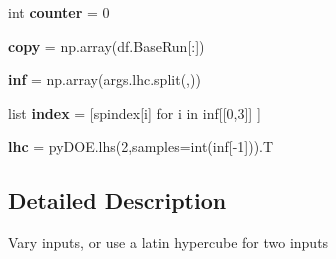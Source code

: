 \begin{DoxyCompactItemize}
int {\bfseries counter} = 0
\item 
\mbox{\label{namespacezics__sense_adad1c9bd87458cee13344e8c2c37d480}} 
{\bfseries copy} = np.\+array(df.\+Base\+Run\mbox{[}\+:\mbox{]})
\item 
\mbox{\label{namespacezics__sense_a28ee685820337f3c2a935246cfed9974}} 
{\bfseries inf} = np.\+array(args.\+lhc.\+split(\textquotesingle{},\textquotesingle{}))
\item 
\mbox{\label{namespacezics__sense_a4c16dfebc4d8f9aa0ca680fef0e59d7d}} 
list {\bfseries index} = \mbox{[}spindex\mbox{[}i\mbox{]} for i in inf\mbox{[}\mbox{[}0,3\mbox{]}\mbox{]} \mbox{]}
\item 
\mbox{\label{namespacezics__sense_a349aee1587e23db8c820d055a65f52cc}} 
{\bfseries lhc} = py\+D\+O\+E.\+lhs(2,samples=int(inf\mbox{[}-\/1\mbox{]})).T
\end{DoxyCompactItemize}


\subsection{Detailed Description}
\begin{DoxyVerb}Vary inputs, or use a latin hypercube for two inputs
\end{DoxyVerb}
 